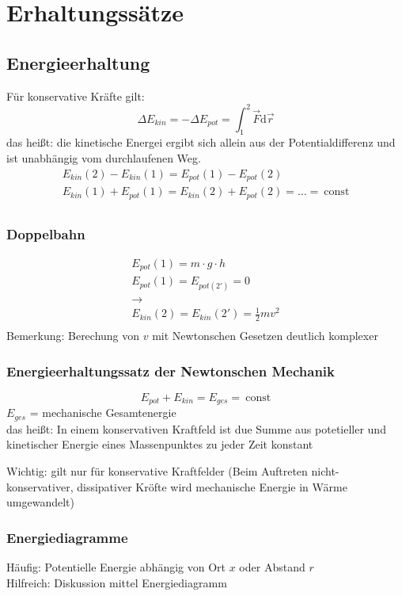 \documentclass[a4paper]{scrartcl}
\renewcommand{\d}{\mathrm{d}}
\renewcommand{\v}[1]{\vec{#1}}
\theoremstyle{definition}
\theoremstyle{plain}
\theoremstyle{plain}
\theoremstyle{remark}
\theoremstyle{remark}
\theoremstyle{remark}
\begin{document}
\section{Erhaltungssätze}
\label{sec-5}
\subsection{Energieerhaltung}
\label{sec-5-1}
Für konservative Kräfte gilt:
\[\Delta E_{kin} = -\Delta E_{pot} = \int_1^2 \v F\d \v r\]
das heißt: die kinetische Energei ergibt sich allein aus der Potentialdifferenz und ist unabhängig vom durchlaufenen Weg.
\begin{align*}
E_{kin}(2) - E_{kin}(1) = E_{pot}(1) - E_{pot}(2) \\
E_{kin}(1) + E_{pot}(1) = E_{kin}(2) + E_{pot}(2) = \ldots =~\text{const} \\
\end{align*}
\subsubsection{Doppelbahn}
\label{sec-5-1-1}
\begin{align*}
E_{pot}(1) = m\cdot g\cdot h \\
E_{pot}(1) = E_{pot(2')} = 0 \\
\rightarrow \\
E_{kin}(2) = E_{kin}(2') = \frac{1}{2}m v^2 \\
\end{align*}
Bemerkung: Berechung von $v$ mit Newtonschen Gesetzen deutlich komplexer
\subsubsection{Energieerhaltungssatz der Newtonschen Mechanik}
\label{sec-5-1-2}
\[E_{pot} + E_{kin} = E_{ges} = ~\text{const}\]
$E_{ges}$ = mechanische Gesamtenergie \\
    das heißt: In einem konservativen Kraftfeld ist due Summe aus potetieller und kinetischer Energie
eines Massenpunktes zu jeder Zeit konstant

Wichtig: gilt nur für konservative Kraftfelder (Beim Auftreten nicht-konservativer, dissipativer Kröfte wird
mechanische Energie in Wärme umgewandelt)
\subsubsection{Energiediagramme}
\label{sec-5-1-3}
Häufig: Potentielle Energie abhängig von Ort $x$ oder Abstand $r$ \\
    Hilfreich: Diskussion mittel Energiediagramm
\end{document}
